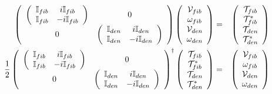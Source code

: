 \begin{eqnarray}
\left( 
\begin{array}{cc}
\left( 
\begin{array}{cc}
{\Bbb I}_{fib} & i{\Bbb I}_{fib} \\ 
{\Bbb I}_{fib} & -i{\Bbb I}_{fib}%
\end{array}%
\right) & 0 \\ 
0 & \left( 
\begin{array}{cc}
{\Bbb I}_{den} & i{\Bbb I}_{den} \\ 
{\Bbb I}_{den} & -i{\Bbb I}_{den}%
\end{array}%
\right)%
\end{array}%
\right) \left( 
\begin{array}{c}
{\cal V}_{fib} \\ 
\omega _{fib} \\ 
{\cal V}_{den} \\ 
\omega _{den}%
\end{array}%
\right) &=&\left( 
\begin{array}{c}
{\cal T}_{fib} \\ 
{\cal T}_{fib}^{\ast } \\ 
{\cal T}_{den} \\ 
{\cal T}_{den}^{\ast }%
\end{array}%
\right) \\
\frac{1}{2}\left( 
\begin{array}{cc}
\left( 
\begin{array}{cc}
{\Bbb I}_{fib} & i{\Bbb I}_{fib} \\ 
{\Bbb I}_{fib} & -i{\Bbb I}_{fib}%
\end{array}%
\right) & 0 \\ 
0 & \left( 
\begin{array}{cc}
{\Bbb I}_{den} & i{\Bbb I}_{den} \\ 
{\Bbb I}_{den} & -i{\Bbb I}_{den}%
\end{array}%
\right)%
\end{array}%
\right) ^{\dagger }\left( 
\begin{array}{c}
{\cal T}_{fib} \\ 
{\cal T}_{fib}^{\ast } \\ 
{\cal T}_{den} \\ 
{\cal T}_{den}^{\ast }%
\end{array}%
\right) &=&\left( 
\begin{array}{c}
{\cal V}_{fib} \\ 
\omega _{fib} \\ 
{\cal V}_{den} \\ 
\omega _{den}%
\end{array}%
\right)
\end{eqnarray}%
